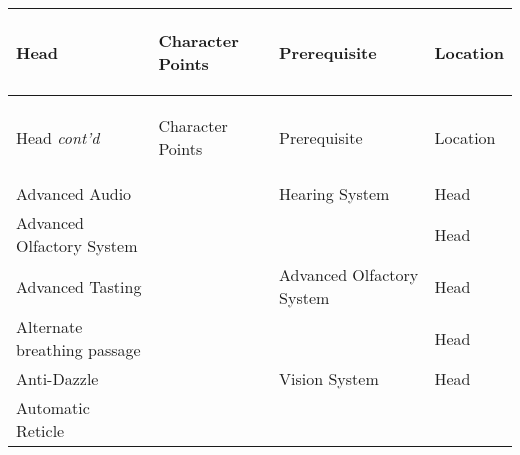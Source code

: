 \documentclass[twoside]{book}
\begin{document}
\begin{longtable}{p{1.25in}p{2em}ll} 
  Head
  &
  \begin{turn}{70}{Character Points}\end{turn}
          
  &
  \begin{turn}{70}{Prerequisite}\end{turn}
          
  &
  \begin{turn}{70}{Location}\end{turn}
          
  \\
  \hline
  \hline
  \endfirsthead
  Head \textit{cont'd}
        
  &
  \begin{turn}{70}{Character Points}\end{turn}
          
  &
  \begin{turn}{70}{Prerequisite}\end{turn}
          
  &
  \begin{turn}{70}{Location}\end{turn}
          
  \\
  \endhead
      
  \raggedright
           Advanced Audio 
  &
  
  &
   Hearing System 
  &
   Head 
  \tabularnewline
  \hline
      
  \raggedright
           Advanced Olfactory System
           
  &
  
  &
  
  &
   Head 
  \tabularnewline
  \hline
      
  \raggedright
           Advanced Tasting 
  &
  
  &
   Advanced Olfactory
           System 
  &
   Head 
  \tabularnewline
  \hline
      
  \raggedright
           Alternate breathing passage
           
  &
  
  &
  
  &
   Head 
  \tabularnewline
  \hline
      
  \raggedright
           Anti-Dazzle 
  &
  
  &
   Vision System 
  &
   Head 
  \tabularnewline
  \hline
      
  \raggedright
           Automatic Reticle 
  &
  

\end{longtable}
\end{document}
